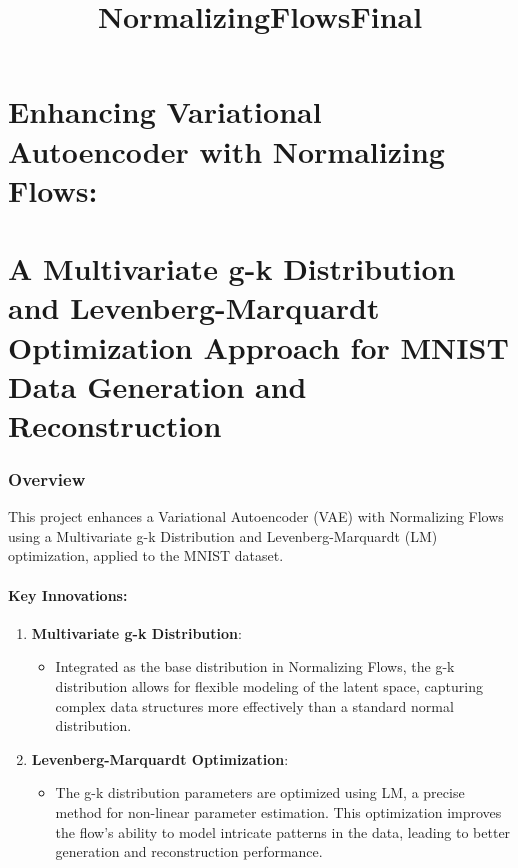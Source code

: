 \documentclass[11pt]{article}
\title{NormalizingFlowsFinal}
\providecommand{\tightlist}{%
      \setlength{\itemsep}{0pt}\setlength{\parskip}{0pt}}
\begin{document}
    
    \maketitle
    
    

    
    \section{Enhancing Variational Autoencoder with Normalizing
Flows:}\label{enhancing-variational-autoencoder-with-normalizing-flows}

\section{A Multivariate g-k Distribution and Levenberg-Marquardt
Optimization Approach for MNIST Data Generation and
Reconstruction}\label{a-multivariate-g-k-distribution-and-levenberg-marquardt-optimization-approach-for-mnist-data-generation-and-reconstruction}

    \subsubsection{Overview}\label{overview}

This project enhances a Variational Autoencoder (VAE) with Normalizing
Flows using a Multivariate g-k Distribution and Levenberg-Marquardt (LM)
optimization, applied to the MNIST dataset.

\paragraph{Key Innovations:}\label{key-innovations}

\begin{enumerate}
\def\labelenumi{\arabic{enumi}.}
\tightlist
\item
  \textbf{Multivariate g-k Distribution}:

  \begin{itemize}
  \tightlist
  \item
    Integrated as the base distribution in Normalizing Flows, the g-k
    distribution allows for flexible modeling of the latent space,
    capturing complex data structures more effectively than a standard
    normal distribution.
  \end{itemize}
\item
  \textbf{Levenberg-Marquardt Optimization}:

  \begin{itemize}
  \tightlist
  \item
    The g-k distribution parameters are optimized using LM, a precise
    method for non-linear parameter estimation. This optimization
    improves the flow's ability to model intricate patterns in the data,
    leading to better generation and reconstruction performance.
  \end{itemize}
\end{enumerate}
\end{document}
